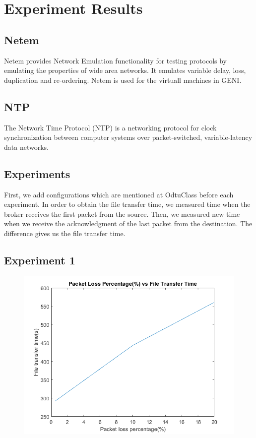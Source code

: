 \documentclass[conference]{IEEEtran}
\begin{document}
\section{Experiment Results}

\subsection{Netem}
Netem provides Network Emulation functionality for testing protocols by emulating the properties of wide area networks. It emulates variable delay, loss, duplication and re-ordering. Netem is used for the virtuall machines in GENI.

\subsection{NTP}
The Network Time Protocol (NTP) is a networking protocol for clock synchronization between computer systems over packet-switched, variable-latency data networks.

\subsection{Experiments}
First, we add configurations which are mentioned at OdtuClass before each experiment. In order to obtain the file transfer time,  we measured time when the broker receives the first packet from the source. Then, we measured new time when we receive the acknowledgment of the last packet from the destination. The difference gives us the file transfer time.


\subsection*{Experiment 1}

\begin{figure}[h]
\centerline{\includegraphics[scale=0.5]{exp1.png}}
\caption{}
\label{fig}
\end{figure}
\end{document}
